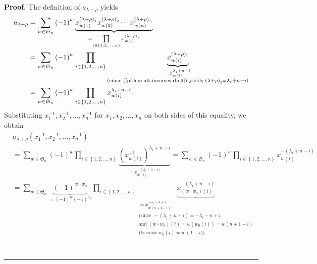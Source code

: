 \documentclass[numbers=enddot,12pt,final,onecolumn,notitlepage]{scrartcl}%
\theoremstyle{definition}
\newenvironment{proof}[1][Proof]{\noindent\textbf{#1.} }{\ \rule{0.5em}{0.5em}}
\let\sumnonlimits\sum
\let\prodnonlimits\prod
\renewcommand{\sum}{\sumnonlimits\limits}
\renewcommand{\prod}{\prodnonlimits\limits}
\begin{document}
\begin{proof}
The definition of $a_{\lambda+\rho}$ yields%
\begin{align*}
a_{\lambda+\rho}  &  =\sum_{w\in\mathfrak{S}_{n}}\left(  -1\right)
^{w}\underbrace{x_{w\left(  1\right)  }^{\left(  \lambda+\rho\right)  _{1}%
}x_{w\left(  2\right)  }^{\left(  \lambda+\rho\right)  _{2}}\cdots x_{w\left(
n\right)  }^{\left(  \lambda+\rho\right)  _{n}}}_{=\prod_{i\in\left\{
1,2,\ldots,n\right\}  }x_{w\left(  i\right)  }^{\left(  \lambda+\rho\right)
_{i}}}\\
&  =\sum_{w\in\mathfrak{S}_{n}}\left(  -1\right)  ^{w}\prod_{i\in\left\{
1,2,\ldots,n\right\}  }\underbrace{x_{w\left(  i\right)  }^{\left(
\lambda+\rho\right)  _{i}}}_{\substack{=x_{w\left(  i\right)  }^{\lambda
_{i}+n-i}\\\text{(since (\ref{pf.lem.alt.inverses.rho2}) yields }\left(
\lambda+\rho\right)  _{i}=\lambda_{i}+n-i\text{)}}}\\
&  =\sum_{w\in\mathfrak{S}_{n}}\left(  -1\right)  ^{w}\prod_{i\in\left\{
1,2,\ldots,n\right\}  }x_{w\left(  i\right)  }^{\lambda_{i}+n-i}.
\end{align*}
Substituting $x_{1}^{-1},x_{2}^{-1},\ldots,x_{n}^{-1}$ for $x_{1},x_{2}%
,\ldots,x_{n}$ on both sides of this equality, we obtain%
\begin{align}
&  a_{\lambda+\rho}\left(  x_{1}^{-1},x_{2}^{-1},\ldots,x_{n}^{-1}\right)
\nonumber\\
&  =\sum_{w\in\mathfrak{S}_{n}}\left(  -1\right)  ^{w}\prod_{i\in\left\{
1,2,\ldots,n\right\}  }\underbrace{\left(  x_{w\left(  i\right)  }%
^{-1}\right)  ^{\lambda_{i}+n-i}}_{=x_{w\left(  i\right)  }^{-\left(
\lambda_{i}+n-i\right)  }}=\sum_{w\in\mathfrak{S}_{n}}\left(  -1\right)
^{w}\prod_{i\in\left\{  1,2,\ldots,n\right\}  }x_{w\left(  i\right)
}^{-\left(  \lambda_{i}+n-i\right)  }\nonumber\\
&  =\sum_{w\in\mathfrak{S}_{n}}\underbrace{\left(  -1\right)  ^{w\circ w_{0}}%
}_{=\left(  -1\right)  ^{w}\left(  -1\right)  ^{w_{0}}}\prod_{i\in\left\{
1,2,\ldots,n\right\}  }\underbrace{x_{\left(  w\circ w_{0}\right)  \left(
i\right)  }^{-\left(  \lambda_{i}+n-i\right)  }}_{\substack{=x_{w\left(
n+1-i\right)  }^{-\lambda_{i}-n+i}\\\text{(since }-\left(  \lambda
_{i}+n-i\right)  =-\lambda_{i}-n+i\\\text{and }\left(  w\circ w_{0}\right)
\left(  i\right)  =w\left(  w_{0}\left(  i\right)  \right)  =w\left(
n+1-i\right)  \\\text{(because }w_{0}\left(  i\right)  =n+1-i\text{))}%
}}\nonumber\\

\end{align}
\end{proof}
\end{document}
